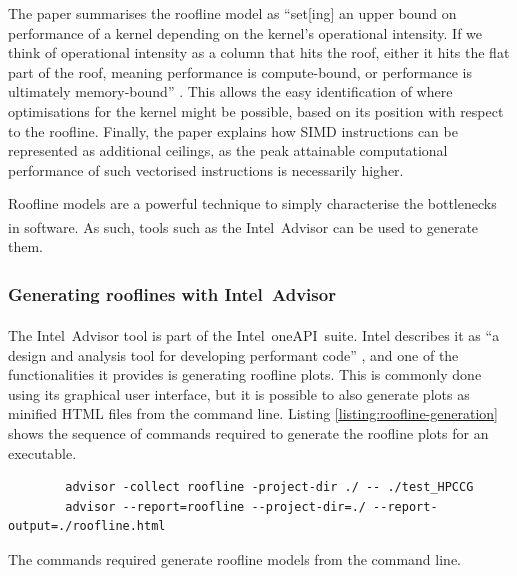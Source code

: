 The paper summarises the roofline model as ``set[ing] an upper bound on performance of a kernel depending on the kernel’s operational intensity. If we think of operational intensity as a column that hits the roof, either it hits the flat part of the roof, meaning performance is compute-bound, or performance is ultimately memory-bound'' \cite{williamsRooflineInsightfulVisual2009}. This allows the easy identification of where optimisations for the kernel might be possible, based on its position with respect to the roofline. Finally, the paper explains how SIMD instructions can be represented as additional ceilings, as the peak attainable computational performance of such vectorised instructions is necessarily higher.


Roofline models are a powerful technique to simply characterise the bottlenecks in software. As such, tools such as the Intel\textsuperscript{\textregistered}\ Advisor can be used to generate them.

\subsubsection{Generating rooflines with Intel\textsuperscript{\textregistered}\ Advisor}
\label{sssec:roofline-generation-intel-advisor}

The Intel\textsuperscript{\textregistered}\ Advisor tool is part of the Intel\textsuperscript{\textregistered}\ oneAPI\texttrademark\ suite. Intel describes it as ``a design and analysis tool for developing performant code'' \cite{DesignCodeParallelism}, and one of the functionalities it provides is generating roofline plots. This is commonly done using its graphical user interface, but it is possible to also generate plots as minified HTML files from the command line. Listing \ref{listing:roofline-generation} shows the sequence of commands required to generate the roofline plots for an executable. 

\begin{code}
    \begin{verbatim}
        advisor -collect roofline -project-dir ./ -- ./test_HPCCG
        advisor --report=roofline --project-dir=./ --report-output=./roofline.html
    \end{verbatim}
    \caption{The commands required generate roofline models from the command line.}
    \label{listing:roofline-generation}
\end{code}

